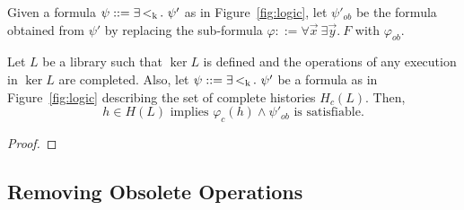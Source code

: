 Given a formula $\psi::=\exists\poker.\ \psi'$ as in Figure~\ref{fig:logic}, let $\psi'_{ob}$ be the formula
obtained from $\psi'$ by replacing the sub-formula $\varphi::=\forall \vec{x}\ \exists \vec{y}.\ F$
with $\varphi_{ob}$.

\begin{theorem}\label{th:satisfiability_pending}
Let $L$ be a library such that $\ker L$ is defined and the operations of any execution in $\ker L$ are completed.
Also, let $\psi::=\exists\poker.\ \psi'$ be a formula as in Figure~\ref{fig:logic} describing the set of 
complete histories $H_c(L)$. Then,
\[
h\in H(L)\mbox{ implies }\varphi_c(h)\land \psi'_{ob}\mbox{ is satisfiable.}
\]
\end{theorem}
\begin{proof}

\end{proof}

\subsection{Removing Obsolete Operations}

















